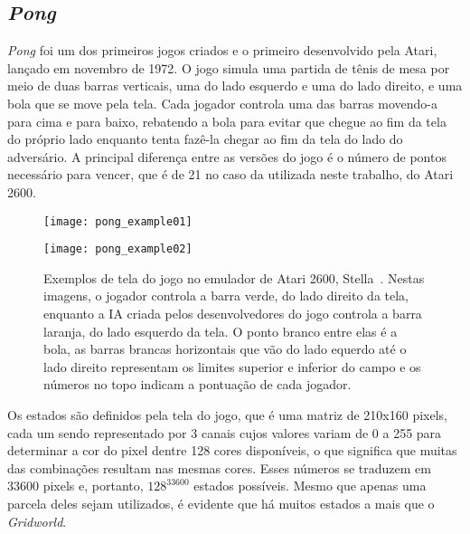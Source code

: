 \subsection{\textit{Pong}}
\label{sec:pong}

\textit{Pong} foi um dos primeiros jogos criados e o primeiro desenvolvido pela Atari, lançado em novembro de 1972.
O jogo simula uma partida de tênis de mesa por meio de duas barras verticais, uma do lado esquerdo e uma do lado direito, e uma bola que se move pela tela.
Cada jogador controla uma das barras movendo-a para cima e para baixo, rebatendo a bola para evitar que chegue ao fim da tela do próprio lado enquanto tenta fazê-la chegar ao fim da tela do lado do adversário.
A principal diferença entre as versões do jogo é o número de pontos necessário para vencer, que é de 21 no caso da utilizada neste trabalho, do Atari 2600.

\begin{figure}[h!]
  \begin{minipage}[b]{.5\textwidth}
  \centering
  \texttt{[image: pong\_example01]}
  \end{minipage}
  \hfill
  \begin{minipage}[b]{.5\textwidth}
  \texttt{[image: pong\_example02]}
  \end{minipage}
  \caption{Exemplos de tela do jogo no emulador de Atari 2600, Stella~\cite{stella}. Nestas imagens, o jogador controla a barra verde, do lado direito da tela, enquanto a IA criada pelos desenvolvedores do jogo controla a barra laranja, do lado esquerdo da tela. O ponto branco entre elas é a bola, as barras brancas horizontais que vão do lado equerdo até o lado direito representam os limites superior e inferior do campo e os números no topo indicam a pontuação de cada jogador.}
\end{figure}

Os estados são definidos pela tela do jogo, que é uma matriz de 210x160 pixels, cada um sendo representado por 3 canais cujos valores variam de 0 a 255 para determinar a cor do pixel dentre 128 cores disponíveis, o que significa que muitas das combinações resultam nas mesmas cores.
Esses números se traduzem em 33600 pixels e, portanto, $128^{33600}$ estados possíveis.
Mesmo que apenas uma parcela deles sejam utilizados, é evidente que há muitos estados a mais que o \textit{Gridworld}.

